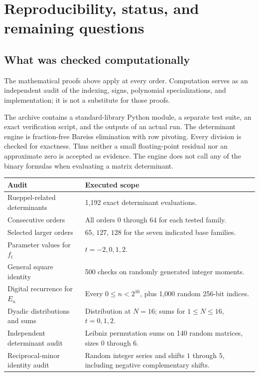 \documentclass[11pt,a4paper]{article}
\numberwithin{equation}{section}
\theoremstyle{definition}
\theoremstyle{remark}
\begin{document}
\section{Reproducibility, status, and remaining questions}\label{sec:status}

\subsection{What was checked computationally}

The mathematical proofs above apply at every order. Computation serves
as an independent audit of the indexing, signs, polynomial specializations,
and implementation; it is not a substitute for those proofs.

The archive contains a standard-library Python module, a separate test
suite, an exact verification script, and the outputs of an actual run.
The determinant engine is fraction-free Bareiss elimination with row
pivoting. Every division is checked for exactness. Thus neither a small
floating-point residual nor an approximate zero is accepted as evidence.
The engine does not call any of the binary formulas when evaluating a
matrix determinant.

\begin{center}
\small
\begin{tabular}{@{}p{}p{}@{}}
\toprule
Audit & Executed scope\\
\midrule
Rueppel-related determinants & 1,192 exact determinant evaluations.\\
Consecutive orders & All orders $0$ through $64$ for each tested family.\\
Selected larger orders & $65$, $127$, $128$ for the seven indicated base families.\\
Parameter values for $f_t$ & $t=-2,0,1,2$.\\
General square identity & 500 checks on randomly generated integer moments.\\
Digital recurrence for $E_n$ & Every $0\le n<2^{16}$, plus 1,000 random 256-bit indices.\\
Dyadic distributions and sums & Distribution at $N=16$; sums for $1\le N\le16$, $t=0,1,2$.\\
Independent determinant audit & Leibniz permutation sums on 140 random matrices, sizes $0$ through $6$.\\
Reciprocal-minor identity audit & Random integer series and shifts $1$ through $5$, including negative complementary shifts.\\
\bottomrule
\end{tabular}
\end{center}
\end{document}
